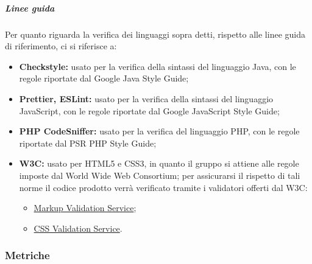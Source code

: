 					\subparagraph{Linee guida}
					Per quanto riguarda la verifica dei linguaggi sopra detti, rispetto alle linee guida di riferimento, ci si riferisce a:
					\begin{itemize}
						\item \textbf{Checkstyle:} usato per la verifica della sintassi del linguaggio Java, con le regole riportate dal Google Java Style Guide;
						\item \textbf{Prettier, ESLint:} usato per la verifica della sintassi del linguaggio JavaScript, con le regole riportate dal Google JavaScript Style Guide;
						\item \textbf{PHP CodeSniffer:} usato per la verifica del linguaggio PHP, con le regole riportate dal PSR PHP Style Guide;						
						\item \textbf{W3C:} usato per HTML5 e CSS3, in quanto il gruppo si attiene alle regole imposte dal World Wide Web Consortium; per assicurarsi il rispetto di tali norme il codice prodotto verrà verificato tramite i validatori offerti dal W3C:
						\begin{itemize}
							\item \href{https://validator.w3.org/}{Markup Validation Service};
							\item \href{https://jigsaw.w3.org/css-validator/}{CSS Validation Service}.
						\end{itemize}
					\end{itemize}


		\subsubsection{Metriche}






